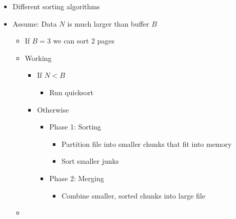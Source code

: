 \begin{itemize}
\begin{itemize}
            \item Different sorting algorithms
            \item Assume: Data $N$ is much larger than buffer $B$
                \begin{itemize}
                    \item If $B = 3$ we can sort $2$ pages
                    \item Working
                        \begin{itemize}
                            \item If $N < B$
                                \begin{itemize}
                                    \item Run quicksort
                                \end{itemize}
                            \item Otherwise
                                \begin{itemize}
                                    \item Phase 1: Sorting
                                        \begin{itemize}
                                            \item Partition file into smaller chunks that fit into memory
                                            \item Sort smaller junks
                                        \end{itemize}
                                    \item Phase 2: Merging
                                        \begin{itemize}
                                            \item Combine smaller, sorted chunks into large file
                                        \end{itemize}
                                \end{itemize}
                        \end{itemize}
                    \item {}
                \end{itemize}
        \end{itemize}
        \begin{itemize}
                \begin{itemize}

\end{itemize}
\end{itemize}
\end{itemize}
